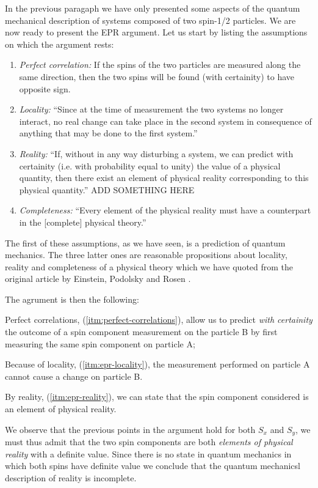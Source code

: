 In the previous paragaph we have only presented some aspects of the quantum mechanical description of systems composed of two spin-1/2 particles. We are now ready to present the EPR argument.
Let us start by listing the assumptions on which the argument rests:
\begin{enumerate}
  \renewcommand{\theenumi}{\alph{enumi}}
  \renewcommand{\labelenumi}{(\theenumi)}
\item \label{itm:perfect-correlations} \textit{Perfect correlation:} If the spins of the two particles are measured along the same direction, then the two spins will be found (with certainity) to have opposite sign.
\item \label{itm:epr-locality} \textit{Locality:} ``Since at the time of measurement the two systems no longer interact, no real change can take place in the second system in consequence of anything that may be done to the first system.''
\item \label{itm:epr-reality} \textit{Reality:} ``If, without in any way disturbing a system, we can predict with certainity (i.e. with probability equal to unity) the value of a physical quantity, then there exist an element of physical reality corresponding to this physical quantity.'' ADD SOMETHING HERE
\item \label{itm:epr-completeness} \textit{Completeness:} ``Every element of the physical reality must have a counterpart in the [complete] physical theory.''
\end{enumerate}
The first of these assumptions, as we have seen, is a prediction of quantum mechanics. The three latter ones are reasonable propositions about locality, reality and completeness of a physical theory which we have quoted from the original article by Einstein, Podolsky and Rosen \cite{PhysRev.47.777}.

The agrument is then the following:
\begin{enumerate*}
\item Perfect correlations, (\ref{itm:perfect-correlations}), allow us to predict \textit{with certainity} the outcome of a spin component measurement on the particle B by first measuring the same spin component on particle A;
\item Because of locality, (\ref{itm:epr-locality}), the measurement performed on particle A cannot cause a change on particle B.
\item By reality, (\ref{itm:epr-reality}), we can state that the spin component considered is an element of physical reality.
\item We observe that the previous points in the argument hold for both $S_x$ and $S_y$, we must thus admit that the two spin components are both \textit{elements of physical reality} with a definite value. Since there is no state in quantum mechanics in which both spins have definite value we conclude that the quantum mechanicsl description of reality is incomplete.
\end{enumerate*}


